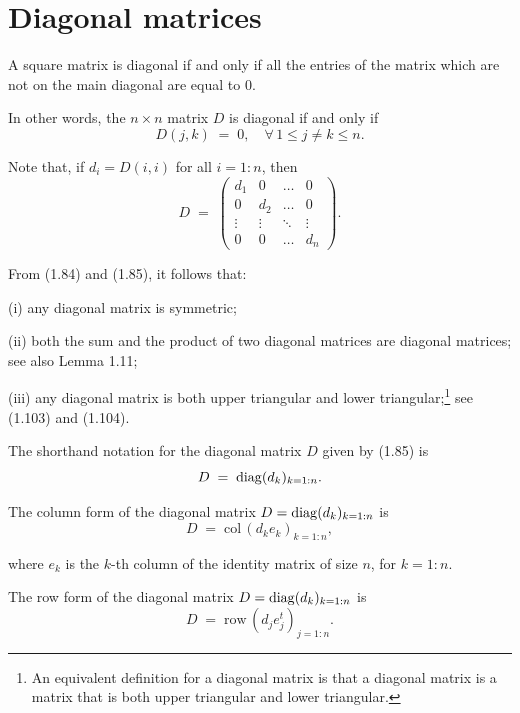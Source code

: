 
\section{Diagonal matrices}

\begin{definition}
A square matrix is diagonal if and only if all the entries of the matrix
which are not on the main diagonal are equal to $0$.

In other words, the $n\times n$ matrix $D$ is diagonal if and only if
\begin{equation}
D(j,k) \;=\; 0, \quad \forall\, 1\le j\ne k\le n.
\end{equation}
\end{definition}

Note that, if $d_i=D(i,i)$ for all $i=1:n$, then
\begin{equation}
D \;=\; \begin{pmatrix} d_1 & 0 & \ldots & 0 \\ 0 & d_2 & \ldots & 0 \\
\vdots & \vdots & \ddots & \vdots \\ 0 & 0 & \ldots & d_n \end{pmatrix}.
\end{equation}

From (1.84) and (1.85), it follows that:

(i) any diagonal matrix is symmetric;

(ii) both the sum and the product of two diagonal matrices are diagonal
matrices; see also Lemma 1.11;

(iii) any diagonal matrix is both upper triangular and lower
triangular;\footnote{An equivalent definition for a diagonal matrix is
that a diagonal matrix is a matrix that is both upper triangular and
lower triangular.} see (1.103) and (1.104).

The shorthand notation for the diagonal matrix $D$ given by (1.85) is
\[
D \;=\; \operatorname{diag}(d_k)_{k=1:n}.
\]

The column form of the diagonal matrix $D=\operatorname{diag}(d_k)_{k=1:n}$ is
\begin{equation}
D \;=\; \mathrm{col}\,(d_ke_k)_{k=1:n},
\end{equation}

where $e_k$ is the $k$-th column of the identity matrix of size $n$, for
$k=1:n$.

The row form of the diagonal matrix $D=\operatorname{diag}(d_k)_{k=1:n}$ is
\begin{equation}
D \;=\; \mathrm{row}\,(d_je_j^t)_{j=1:n}.
\end{equation}

